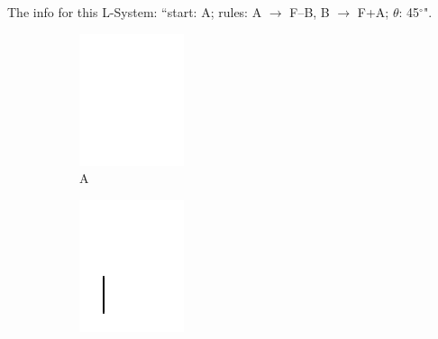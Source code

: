 \documentclass[12pt,twoside]{reedthesis}
\newcommand{\code}[1]{\texttt{#1}}
\begin{document}
	The info for this L-System: ``start: A; rules: A $\rightarrow$ F–B, B $\rightarrow$ F+A; $\theta$: 45$^{\circ}$".


	\begin{figure}[h]
	\begin{subfigure}{0.25\textwidth}
		\centering
		\includegraphics[height=0.8\textwidth]{Images/B0}
		\caption{A}
		\label {B0}
	\end{subfigure}%
	\begin{subfigure}{0.25\textwidth}
		\centering
		\includegraphics[height=0.8\textwidth]{Images/B1}

\end{subfigure}
\end{figure}
\end{document}
